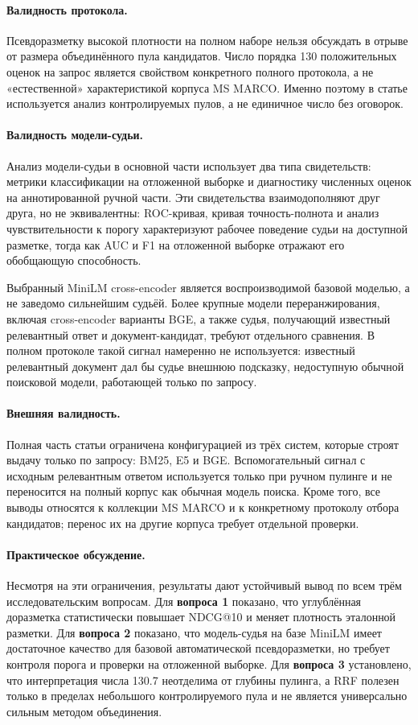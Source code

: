 \documentclass[runningheads,a4paper]{llncs}
\begin{document}
\paragraph{Валидность протокола.} Псевдоразметку высокой плотности на полном наборе нельзя обсуждать в отрыве от размера объединённого пула кандидатов. Число порядка 130 положительных оценок на запрос является свойством конкретного полного протокола, а не «естественной» характеристикой корпуса MS MARCO. Именно поэтому в статье используется анализ контролируемых пулов, а не единичное число без оговорок.

\paragraph{Валидность модели-судьи.} Анализ модели-судьи в основной части использует два типа свидетельств: метрики классификации на отложенной выборке и диагностику численных оценок на аннотированной ручной части. Эти свидетельства взаимодополняют друг друга, но не эквивалентны: ROC-кривая, кривая точность-полнота и анализ чувствительности к порогу характеризуют рабочее поведение судьи на доступной разметке, тогда как AUC и F1 на отложенной выборке отражают его обобщающую способность.

Выбранный MiniLM cross-encoder является воспроизводимой базовой моделью, а не заведомо сильнейшим судьёй. Более крупные модели переранжирования, включая cross-encoder варианты BGE, а также судья, получающий известный релевантный ответ и документ-кандидат, требуют отдельного сравнения. В полном протоколе такой сигнал намеренно не используется: известный релевантный документ дал бы судье внешнюю подсказку, недоступную обычной поисковой модели, работающей только по запросу.

\paragraph{Внешняя валидность.} Полная часть статьи ограничена конфигурацией из трёх систем, которые строят выдачу только по запросу: BM25, E5 и BGE. Вспомогательный сигнал с исходным релевантным ответом используется только при ручном пулинге и не переносится на полный корпус как обычная модель поиска. Кроме того, все выводы относятся к коллекции MS MARCO и к конкретному протоколу отбора кандидатов; перенос их на другие корпуса требует отдельной проверки.

\paragraph{Практическое обсуждение.} Несмотря на эти ограничения, результаты дают устойчивый вывод по всем трём исследовательским вопросам. Для \textbf{вопроса 1} показано, что углублённая доразметка статистически повышает NDCG@10 и меняет плотность эталонной разметки. Для \textbf{вопроса 2} показано, что модель-судья на базе MiniLM имеет достаточное качество для базовой автоматической псевдоразметки, но требует контроля порога и проверки на отложенной выборке. Для \textbf{вопроса 3} установлено, что интерпретация числа 130.7 неотделима от глубины пулинга, а RRF полезен только в пределах небольшого контролируемого пула и не является универсально сильным методом объединения.
\end{document}
